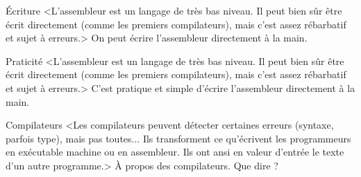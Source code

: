 \begin{quiz}[title={Langage machine}]
\begin{quizquestion*}[b]{1}{2}{Écriture}
<L'assembleur est un langage de très bas niveau. Il peut bien sûr être écrit directement (comme les premiers compilateurs), mais c'est assez rébarbatif et sujet à erreurs.>
On peut écrire l'assembleur directement à la main.
\end{quizquestion*}

\begin{quizquestion*}[b]{2}{1}{Praticité}
<L'assembleur est un langage de très bas niveau. Il peut bien sûr être écrit directement (comme les premiers compilateurs), mais c'est assez rébarbatif et sujet à erreurs.>
C'est pratique et simple d'écrire l'assembleur directement à la main.
\end{quizquestion*}
\end{quiz}

\begin{quiz}[title={Compilation}]
\begin{quizquestion}[b]{1}{2}{Compilateurs}
<Les compilateurs peuvent détecter certaines erreurs (syntaxe, parfois type), mais pas toutes...
Ils transforment ce qu'écrivent les programmeurs en exécutable machine ou en assembleur. Ils ont ansi en valeur d'entrée le texte d'un autre programme.>
À propos des compilateurs. Que dire ?
\end{quizquestion}
\end{quiz}

